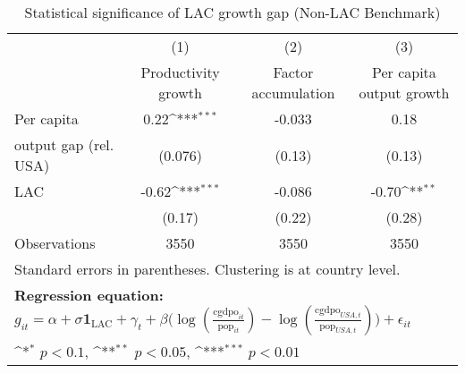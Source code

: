 \begin{table}[htbp]\centering
\def\sym#1{\ifmmode^{#1}\else\(^{#1}\)\fi}
\caption{Statistical significance of LAC growth gap (Non-LAC Benchmark)}
\begin{tabular}{l*{3}{c}}
\toprule
                &\multicolumn{1}{c}{(1)}&\multicolumn{1}{c}{(2)}&\multicolumn{1}{c}{(3)}\\
                &\multicolumn{1}{c}{Productivity growth}&\multicolumn{1}{c}{Factor accumulation}&\multicolumn{1}{c}{Per capita output growth}\\
\midrule
Per capita      &     0.22\sym{***}&   -0.033         &     0.18         \\
output gap (rel. USA)&  (0.076)         &   (0.13)         &   (0.13)         \\
\addlinespace
LAC             &    -0.62\sym{***}&   -0.086         &    -0.70\sym{**} \\
                &   (0.17)         &   (0.22)         &   (0.28)         \\
\midrule
Observations    &     3550         &     3550         &     3550         \\
\bottomrule
\multicolumn{4}{l}{\footnotesize Standard errors in parentheses. Clustering is at country level.}\\
\multicolumn{4}{l}{\footnotesize \textbf{Regression equation:} \(g_{it} = \alpha + \sigma \mathbf{1}_{\textrm{LAC}} + \gamma_t + \beta \big(\log (\frac{\textrm{cgdpo}_{it}}{\textrm{pop}_{it}} ) - \log (\frac{\textrm{cgdpo}_{USA,t}}{\textrm{pop}_{USA,t}}  ) \big) + \epsilon_{it}\)}\\
\multicolumn{4}{l}{\footnotesize \sym{*} \(p<0.1\), \sym{**} \(p<0.05\), \sym{***} \(p<0.01\)}\\
\end{tabular}
\end{table}
